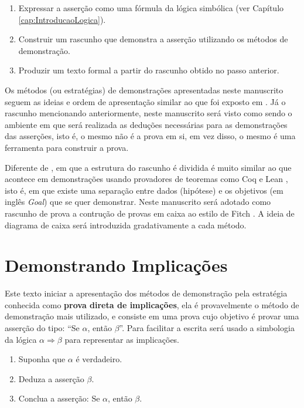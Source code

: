 \begin{enumerate}
	\item Expressar a asserção como uma fórmula da lógica simbólica (ver Capítulo \ref{cap:IntroducaoLogica}).
	\item Construir um rascunho que demonstra a asserção utilizando os métodos de demonstração.
	\item Produzir um texto formal a partir do rascunho obtido no passo anterior.
\end{enumerate}


Os métodos (ou estratégias) de demonstrações apresentadas neste manuscrito seguem as ideias e ordem  de apresentação similar ao que foi exposto em \cite{velleman2019comProvar}. Já o rascunho mencionando anteriormente, neste manuscrito será visto como sendo o ambiente em que será realizada as deduções necessárias para as demonstrações das asserções, isto é, o mesmo não é a prova em si, em vez disso, o mesmo é uma ferramenta para construir a prova. 

Diferente de \cite{velleman2019comProvar}, em que a estrutura do rascunho é dividida é muito similar ao que acontece em demonstrações usando provadores de teoremas como Coq \cite{coq2013} e Lean \cite{lean2015}, isto é, em que existe uma separação entre dados (hipótese) e os objetivos (em inglês \textit{Goal}) que se quer demonstrar. Neste manuscrito será adotado como rascunho de prova a contrução de provas em caixa ao estilo de Fitch \cite{broda2007}. A ideia de diagrama de caixa será introduzida gradativamente a cada método.

\section{Demonstrando Implicações}\label{sec:ProvandoImplicacao}

Este texto iniciar a apresentação dos métodos de demonstração pela estratégia conhecida como \textbf{prova direta de implicações}, ela é provavelmente o método de demonstração mais utilizado, e consiste em uma prova cujo objetivo é provar uma asserção do tipo: ``Se $\alpha$, então $\beta$''. Para facilitar a escrita será usado a simbologia da lógica $\alpha \Rightarrow \beta$ para representar as implicações.

\begin{method}
	\begin{enumerate}
		\item Suponha que $\alpha$ é verdadeiro.
		\item Deduza a asserção $\beta$.
		\item Conclua a asserção: Se $\alpha$, então $\beta$.
	\end{enumerate}
\end{method}

